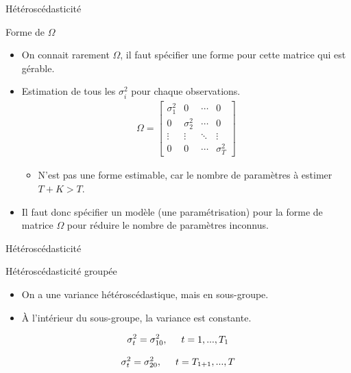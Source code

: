 \documentclass{beamer}
\begin{document}
\begin{frame}{Hétéroscédasticité}
\begin{block}{Forme de $\Omega$}
\begin{itemize}
\item On connait rarement $\Omega$, il faut spécifier une forme pour cette matrice qui est gérable.
\item Estimation de tous les $\sigma_i^2$ pour chaque observations. 
\begin{align*}
\Omega= \begin{bmatrix} \sigma_1^2 & 0 & \cdots & 0 \\
0 & \sigma_{2}^2 & \cdots & 0 \\
\vdots & \vdots & \ddots & \vdots \\
0 & 0 & \cdots & \sigma_T^2
\end{bmatrix}
\end{align*}
\begin{itemize}
\item N’est pas une forme estimable, car le nombre de paramètres à estimer $T+K>T$.
\end{itemize}
\item Il faut donc spécifier un modèle (une paramétrisation) pour la forme de matrice $\Omega$ pour réduire le nombre de paramètres inconnus.
\end{itemize}
\end{block}
\end{frame}

\begin{frame}{Hétéroscédasticité}
\begin{block}{Hétéroscédasticité groupée}
\begin{itemize}
\item On a une variance hétéroscédastique, mais en sous-groupe.
\item À l’intérieur du sous-groupe, la variance est constante.
\end{itemize}
\begin{align*}
\sigma_t^2=\sigma_{10}^2, \hspace{0.5cm} t=1,...,T_1
\end{align*}

\begin{align*}
\sigma_t^2=\sigma_{20}^2, \hspace{0.5cm} t=T_{1+1},...,T
\end{align*}
\end{block}
\end{frame}
\end{document}
